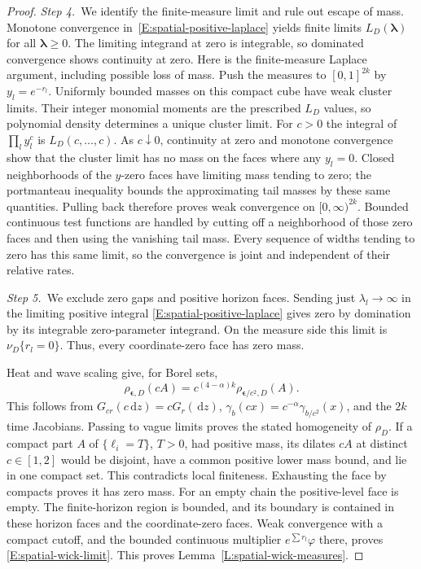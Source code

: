 \documentclass[12pt,oneside,openany]{book}
\numberwithin{equation}{section}
\theoremstyle{nogostyle}
\theoremstyle{definition}
\newcommand{\ud}{\,\mathrm{d}}
\begin{document}
\begin{proof}
  \medskip
  \noindent\textit{Step 4.~}We identify the finite-measure limit and rule out
  escape of mass.
  Monotone convergence in~\eqref{E:spatial-positive-laplace} yields finite
  limits $L_D(\boldsymbol\lambda)$ for all $\boldsymbol\lambda \ge 0$. The
  limiting integrand at zero is integrable, so dominated convergence shows
  continuity at zero. Here is the finite-measure Laplace argument, including
  possible loss of mass. Push the measures to $[0,1]^{2k}$ by $y_l = e^{-r_l}$.
  Uniformly bounded masses on this compact cube have weak cluster limits. Their
  integer monomial moments are the prescribed $L_D$ values, so polynomial
  density determines a unique cluster limit. For $c > 0$ the integral of
  $\prod_l y_l^c$ is $L_D(c,\ldots,c)$. As $c\downarrow0$, continuity at zero
  and monotone convergence show that the cluster limit has no mass on the faces
  where any $y_l = 0$. Closed neighborhoods of the $y$-zero faces have limiting
  mass tending to zero; the portmanteau inequality bounds the approximating tail
  masses by these same quantities. Pulling back therefore proves weak
  convergence on $[0,\infty)^{2k}$. Bounded continuous test functions are
  handled by cutting off a neighborhood of those zero faces and then using the
  vanishing tail mass. Every sequence of widths tending to zero has this same
  limit, so the convergence is joint and independent of their relative rates.


  \medskip
  \noindent\textit{Step 5.~}We exclude zero gaps and positive horizon faces.
  Sending just $\lambda_l \to \infty$ in the limiting positive integral
  \eqref{E:spatial-positive-laplace} gives zero by domination by its integrable
  zero-parameter integrand. On the measure side this limit is $\nu_D\{r_l=0\}$.
  Thus, every coordinate-zero face has zero mass.


  Heat and wave scaling give, for Borel sets,
  \[
    \rho_{\boldsymbol\epsilon,D}(cA)
    =c^{(4-\alpha)k}\rho_{\boldsymbol\epsilon/c^2,D}(A).
  \]
  This follows from $G_{cr}(c\ud z) = cG_r(\ud z)$, $\gamma_b(cx) =
  c^{-\alpha}\gamma_{b/c^2}(x)$, and the $2k$ time Jacobians. Passing to vague
  limits proves the stated homogeneity of $\rho_D$. If a compact part $A$ of
  $\{\ell_i=T\}$, $T > 0$, had positive mass, its dilates $cA$ at distinct $c
  \in [1,2]$ would be disjoint, have a common positive lower mass bound, and lie
  in one compact set. This contradicts local finiteness. Exhausting the face by
  compacts proves it has zero mass. For an empty chain the positive-level face
  is empty. The finite-horizon region is bounded, and its boundary is contained
  in these horizon faces and the coordinate-zero faces. Weak convergence with a
  compact cutoff, and the bounded continuous multiplier $e^{\sum r_l}\varphi$
  there, proves \eqref{E:spatial-wick-limit}. This proves
  Lemma~\ref{L:spatial-wick-measures}.
\end{proof}
\end{document}
